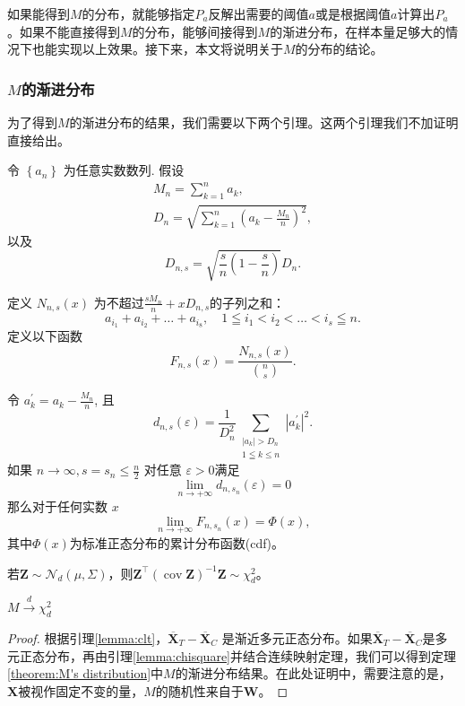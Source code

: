 如果能得到$M$的分布，就能够指定$P_a$反解出需要的阈值$a$或是根据阈值$a$计算出$P_a$。如果不能直接得到$M$的分布，能够间接得到$M$的渐进分布，在样本量足够大的情况下也能实现以上效果。接下来，本文将说明关于$M$的分布的结论。

\subsubsection{$M$的渐进分布}
为了得到$M$的渐进分布的结果，我们需要以下两个引理。这两个引理我们不加证明直接给出。
\begin{lemma}\label{lemma:clt}\cite{erdos1959central}
 令 $\left\{a_n\right\}$ 为任意实数数列. 假设
$$
\begin{gathered}
M_n=\sum_{k=1}^n a_k, \\
D_n=\sqrt{\sum_{k=1}^n\left(a_k-\frac{M_n}{n}\right)^2},
\end{gathered}
$$
以及
$$
D_{n, s}=\sqrt{\frac{s}{n}\left(1-\frac{s}{n}\right)} D_n .
$$

定义 $N_{n, s}(x)$ 为不超过$\frac{s M_n}{n}+x D_{n, s}$的子列之和：
$$
a_{i_1}+a_{i_2}+\ldots+a_{i_8},\quad 1 \leqq i_1<i_2<\ldots<i_s \leqq n.
$$
定义以下函数
$$
F_{n, s}(x)=\frac{N_{n, s}(x)}{\binom{n}{s}} .
$$

令 $a_k^{\prime}=a_k-\frac{M_n}{n}$, 且
$$
d_{n, s}(\varepsilon)=\frac{1}{D_n^2} \sum_{\substack{\left|a_k\right|>D_n \\ 1 \leqq k \leq n}}\left|a_k^{\prime}\right|^2.
$$
如果 $n \rightarrow \infty, s=s_n \leq \frac{n}{2}$ 对任意 $\varepsilon>0$满足
$$
\lim _{n \rightarrow+\infty} d_{n, s_n}(\varepsilon)=0
$$
那么对于任何实数 $x$
$$
\lim _{n \rightarrow+\infty} F_{n, s_n}(x)=\Phi(x),
$$
其中$\Phi(x)$为标准正态分布的累计分布函数(cdf)。
    
\end{lemma}

\begin{lemma}\label{lemma:chisquare}\cite{mardia1979multivariate}
    若$\mathbf{Z} \sim \mathcal{N}_d(\mu, \Sigma)$，则$\mathbf{Z}^{\top}\left(\operatorname{cov}\mathbf{Z}\right)^{-1}\mathbf{Z} \sim \chi_d^2$。
\end{lemma}

\begin{theorem}\label{theorem:M's distribution}\cite{morgan2012rerandomization}
    $M \overset{d}\longrightarrow \chi_d^2$
\end{theorem}

\begin{proof}
    根据引理\ref{lemma:clt}，$\overline{\mathbf{X}}_T-\overline{\mathbf{X}}_C$ 是渐近多元正态分布。如果$\overline{\mathbf{X}}_T-\overline{\mathbf{X}}_C$是多元正态分布，再由引理\ref{lemma:chisquare}并结合连续映射定理\cite{van2000asymptotic}，我们可以得到定理\ref{theorem:M's distribution}中$M$的渐进分布结果。在此处证明中，需要注意的是，$\mathbf{X}$被视作固定不变的量，$M$的随机性来自于$\mathbf{W}$。
\end{proof}

